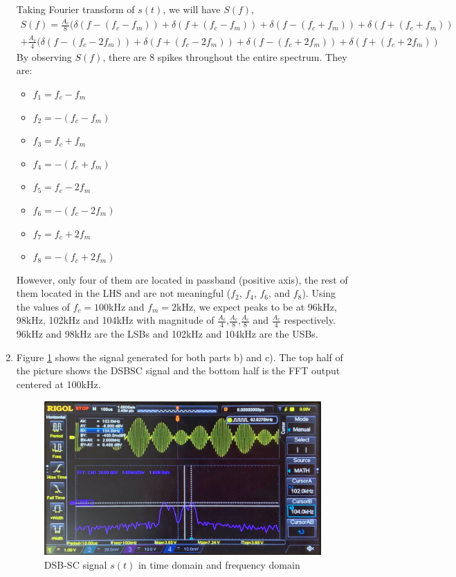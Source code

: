 \documentclass[11pt]{article}
\begin{document}
\begin{enumerate}[label=(\alph*)]
\begin{itemize}
\end{itemize}
Taking Fourier transform of $s(t)$, we will have $S(f)$,
     \begin{align*}
    S(f)= \frac{A_c}{8} (\delta (f-(f_c-f_m)) +\delta (f+(f_c-f_m)) +\delta (f-(f_c+f_m)) +\delta (f+(f_c+f_m))\\
    +\frac{A_c}{4} (\delta (f-(f_c-2f_m)) +\delta (f+(f_c-2f_m)) +\delta (f-(f_c+2f_m)) +\delta (f+(f_c+2f_m))
    \end{align*}
By observing $S(f)$, there are 8 spikes throughout the entire spectrum. They are: 
\begin{multicols}{2}
\begin{itemize}
    \item $f_1=f_c-f_m$
    \item $f_2=-(f_c-f_m)$
    \item $f_3=f_c+f_m$
    \item $f_4=-(f_c+f_m)$
    \item $f_5=f_c-2f_m$
    \item $f_6=-(f_c-2f_m)$
    \item $f_7=f_c+2f_m$
    \item $f_8=-(f_c+2f_m)$
\end{itemize}
\end{multicols}
However, only four of them are located in passband (positive axis), the rest of them located in the LHS and are not meaningful ($f_2$, $f_4$, $f_6$, and $f_8$). Using the values of $f_c = 100$kHz and $f_m = 2$kHz, we expect peaks to be at 96kHz, 98kHz, 102kHz and 104kHz with magnitude of $\frac{A_c}{4}$,$\frac{A_c}{8}$,$\frac{A_c}{8}$ and $\frac{A_c}{4}$ respectively. 96kHz and 98kHz are the LSBs and 102kHz and 104kHz are the USBs.

\item %
Figure \ref{fig:q2} shows the signal generated for both parts b) and c). The top half of the picture shows the DSBSC signal and the bottom half is the FFT output centered at 100kHz.
\begin{figure}[H]
    \centering
    \includegraphics[scale = 0.205]{Q2b.jpg}
    \caption{\label{fig:q2}DSB-SC signal $s(t)$ in time domain and frequency domain}
\end{figure}


\end{enumerate}
\end{document}

